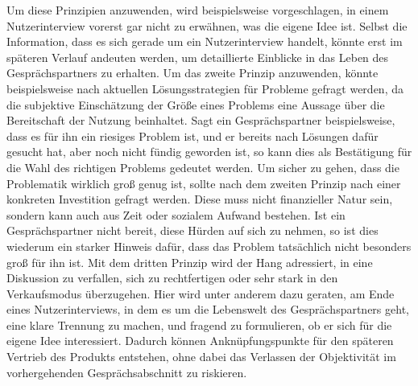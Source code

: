 \noindent Um diese Prinzipien anzuwenden, wird beispielsweise vorgeschlagen, in einem Nutzerinterview vorerst gar nicht zu erwähnen, was die eigene Idee ist. Selbst die Information, dass es sich gerade um ein Nutzerinterview handelt, könnte erst im späteren Verlauf andeuten werden, um detaillierte Einblicke in das Leben des Gesprächspartners zu erhalten. Um das zweite Prinzip anzuwenden, könnte beispielsweise nach aktuellen Lösungsstrategien für Probleme gefragt werden, da die subjektive Einschätzung der Größe eines Problems eine Aussage über die Bereitschaft der Nutzung beinhaltet. Sagt ein Gesprächspartner beispielsweise, dass es für ihn ein riesiges Problem ist, und er bereits nach Lösungen dafür gesucht hat, aber noch nicht fündig geworden ist, so kann dies als Bestätigung für die Wahl des richtigen Problems gedeutet werden. Um sicher zu gehen, dass die Problematik wirklich groß genug ist, sollte nach dem zweiten Prinzip nach einer konkreten Investition gefragt werden. Diese muss nicht finanzieller Natur sein, sondern kann auch aus Zeit oder sozialem Aufwand bestehen. Ist ein Gesprächspartner nicht bereit, diese Hürden auf sich zu nehmen, so ist dies wiederum ein starker Hinweis dafür, dass das Problem tatsächlich nicht besonders groß für ihn ist. Mit dem dritten Prinzip wird der Hang adressiert, in eine Diskussion zu verfallen, sich zu rechtfertigen oder sehr stark in den Verkaufsmodus überzugehen. Hier wird unter anderem dazu geraten, am Ende eines Nutzerinterviews, in dem es um die Lebenswelt des Gesprächspartners geht, eine klare Trennung zu machen, und fragend zu formulieren, ob er sich für die eigene Idee interessiert. Dadurch können Anknüpfungspunkte für den späteren Vertrieb des Produkts entstehen, ohne dabei das Verlassen der Objektivität im vorhergehenden Gesprächsabschnitt zu riskieren.

